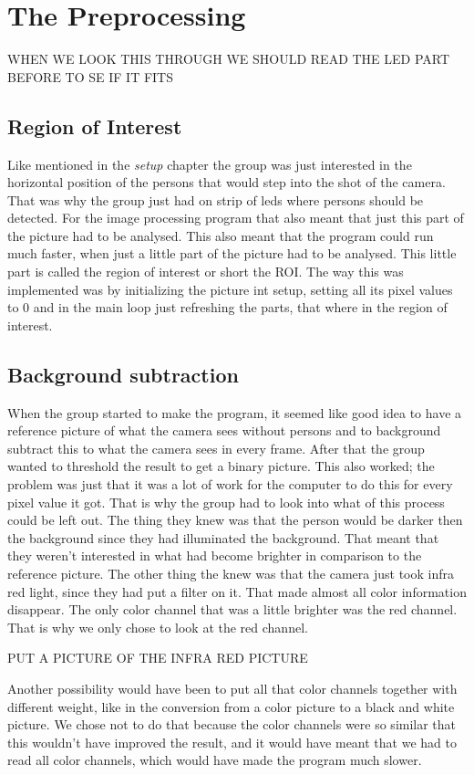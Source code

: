 \section{The Preprocessing}
WHEN WE LOOK THIS THROUGH WE SHOULD READ THE LED PART BEFORE TO SE IF IT FITS
\subsection{Region of Interest}
Like mentioned in the \textit{setup} chapter the group was just interested in the horizontal position of the persons that would step into the shot of the camera. That was why the group just had on strip of leds where persons should be detected. For the image processing program that also meant that just this part of the picture had to be analysed. This also meant that the program could run much faster, when just a little part of the picture had to be analysed. This little part is called the region of interest or short the ROI. 
The way this was implemented was by initializing the picture int setup, setting all its pixel values to 0 and in the main loop just refreshing the parts, that where in the region of interest. 
\subsection{Background subtraction}
When the group started to make the program, it seemed like good idea to have a reference picture of what the camera sees without persons and to background subtract this to what the camera sees in every frame. After that the group wanted to threshold the result to get a binary picture. 
This also worked; the problem was just that it was a lot of work for the computer to do this for every pixel value it got. That is why the group had to look into what of this process could be left out. 
The thing they knew was that the person would be darker then the background since they had illuminated the background. That meant that they weren't interested in what had become brighter in comparison to the reference picture. The other thing the knew was that the camera just took infra red light, since they had put a filter on it. That made almost all color information disappear. The only color channel that was a little brighter was the red channel. That is why we only chose to look at the red channel. 

PUT A PICTURE OF THE INFRA RED PICTURE

Another possibility would have been to put all that color channels together with different weight, like in the conversion from a color picture to a black and white picture. We chose not to do that because the color channels were so similar that this wouldn't have improved the result, and it would have meant that we had to read all color channels, which would have made the program much slower. 

